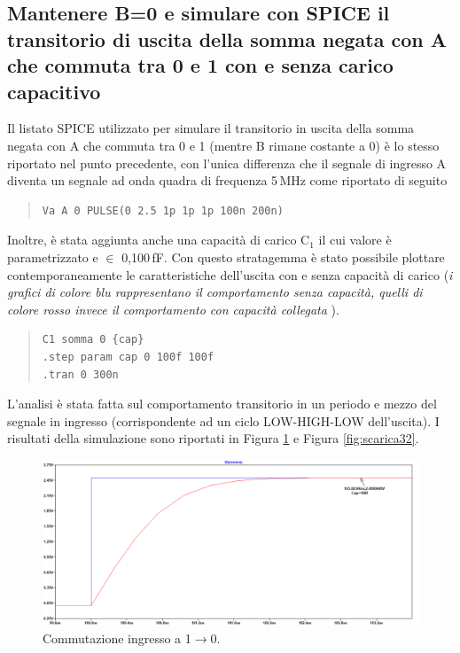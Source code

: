 \documentclass[a4paper,10pt]{article}
\begin{document}
\subsection{Mantenere B=0 e simulare con SPICE il transitorio di uscita della somma negata con A che commuta tra 0 e 1 con e senza carico capacitivo}
Il listato SPICE utilizzato per simulare il transitorio in uscita della somma negata con A che commuta tra 0 e 1 (mentre B rimane costante a 0) è lo stesso riportato nel punto precedente, con l'unica differenza che il segnale di ingresso A diventa un segnale ad onda quadra di frequenza 5$\,$MHz come riportato di seguito
\small
\begin{quote}
\begin{verbatim}
Va A 0 PULSE(0 2.5 1p 1p 1p 100n 200n)
\end{verbatim}
\end{quote}
\normalsize
Inoltre, è stata aggiunta anche una capacità di carico C$_1$ il cui valore è parametrizzato e $\in$ {0,100$\,$fF}. Con questo stratagemma è stato possibile plottare contemporaneamente le caratteristiche dell'uscita con e senza capacità di carico (\small \textit{i grafici di colore blu rappresentano il comportamento senza capacità, quelli di colore rosso invece il comportamento con capacità collegata} \normalsize).
\small
\begin{quote}
\begin{verbatim}
C1 somma 0 {cap}
.step param cap 0 100f 100f
.tran 0 300n
\end{verbatim}
\end{quote}
\normalsize
L'analisi è stata fatta sul comportamento transitorio in un periodo e mezzo del segnale in ingresso (corrispondente ad un ciclo LOW-HIGH-LOW dell'uscita). I risultati della simulazione sono riportati in Figura \ref{fig:carica31} e Figura \ref{fig:scarica32}. 
\begin{figure}[h!]
  	\centering
 	\includegraphics[width=0.9\linewidth]{es2-3-carica.png}
  	\caption{Commutazione ingresso a 1$\rightarrow$0.}
  	\label{fig:carica31}
\end{figure}
\end{document}
